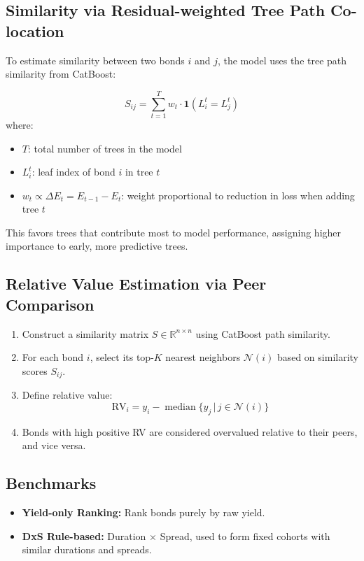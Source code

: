 \documentclass{article}
\begin{document}
\subsection*{Similarity via Residual-weighted Tree Path Co-location}
To estimate similarity between two bonds $i$ and $j$, the model uses the tree path similarity from CatBoost:

\[
S_{ij} = \sum_{t=1}^T w_t \cdot \mathbf{1}\left(L_i^t = L_j^t\right)
\]
where:
\begin{itemize}[nosep]
    \item $T$: total number of trees in the model
    \item $L_i^t$: leaf index of bond $i$ in tree $t$
    \item $w_t \propto \Delta E_t = E_{t-1} - E_t$: weight proportional to reduction in loss when adding tree $t$
\end{itemize}

This favors trees that contribute most to model performance, assigning higher importance to early, more predictive trees.

\subsection*{Relative Value Estimation via Peer Comparison}
\begin{enumerate}[nosep]
    \item Construct a similarity matrix $S \in \mathbb{R}^{n \times n}$ using CatBoost path similarity.
    \item For each bond $i$, select its top-$K$ nearest neighbors $\mathcal{N}(i)$ based on similarity scores $S_{ij}$.
    \item Define relative value:
    \[
    \text{RV}_i = y_i - \operatorname{median} \{ y_j \,|\, j \in \mathcal{N}(i) \}
    \]
    \item Bonds with high positive RV are considered overvalued relative to their peers, and vice versa.
\end{enumerate}

\subsection*{Benchmarks}
\begin{itemize}[nosep]
    \item \textbf{Yield-only Ranking:} Rank bonds purely by raw yield.
    \item \textbf{DxS Rule-based:} Duration $\times$ Spread, used to form fixed cohorts with similar durations and spreads.
\end{itemize}
\end{document}

